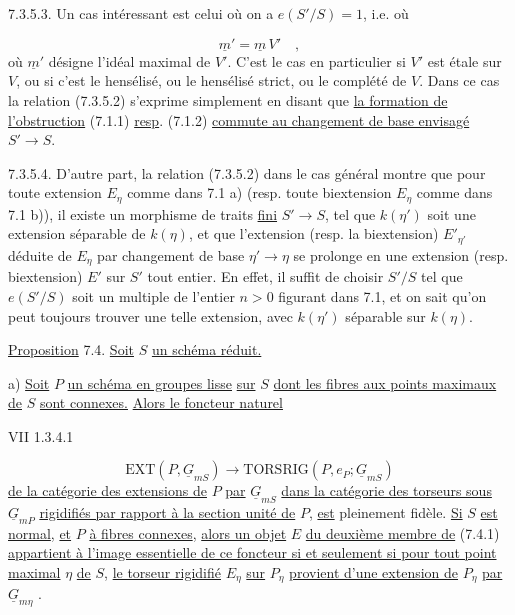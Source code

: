 7.3.5.3. Un cas intéressant est celui où on a $e(S'/S) = 1$, i.e. où

\begin{equation*}
\underline{m}' = \underline{m}\, V' \quad ,
\end{equation*}
où $\underline{m}'$ désigne l'idéal maximal de $V'$. C'est le cas en particulier si $V'$ est étale sur $V$, ou si c'est le hensélisé, ou le hensélisé strict, ou le complété de $V$. Dans ce cas la relation (7.3.5.2) s'exprime simplement en disant que \underline{la formation de l'obstruction} (7.1.1) \underline{resp}. (7.1.2) \underline{commute au changement de base envisagé} $S' \longrightarrow S$.

7.3.5.4. D'autre part, la relation (7.3.5.2) dans le cas général montre que pour toute extension $E_\eta$ comme dans 7.1 a) (resp. toute biextension $E_\eta$ comme dans 7.1 b)), il existe un morphisme de traits \underline{fini} $S' \longrightarrow S$,
tel que $k(\eta')$ soit une extension séparable de $k(\eta)$, et que l'extension (resp. la biextension) $E'_{\eta'}$ déduite de $E_{\eta}$ par changement de base $\eta' \longrightarrow \eta$ se prolonge en une extension (resp. biextension) $E'$ sur $S'$ tout entier. En effet, il suffit de choisir $S'/S$ tel que $e(S'/S)$ soit un multiple de l'entier $n > 0$ figurant dans 7.1, et on sait qu'on peut toujours trouver une telle extension, avec $k(\eta')$ séparable sur $k(\eta)$.


\underline{Proposition} 7.4. \underline{Soit} $S$ \underline{un schéma réduit.}

a) \underline{Soit} $P$ \underline{un schéma en groupes lisse} \underline{sur} $S$ \underline{dont les fibres aux points maximaux de} $S$ \underline{sont connexes.} \underline{Alors le foncteur naturel}

VII 1.3.4.1

\begin{equation}\tag{7.4.1}
\mathrm{EXT}(P,\underline{G}_{mS}) \longrightarrow \mathrm{TORSRIG}(P,e_P;\underline{G}_{mS})
\end{equation}
\underline{de la catégorie des extensions de} $P$ \underline{par} $\underline{G}_{mS}$ \underline{dans la catégorie des torseurs sous} $\underline{G}_{mP}$ \underline{rigidifiés par rapport à la section unité de} $P$, \underline{est} pleinement fidèle. \underline{Si} $S$ \underline{est normal}, \underline{et} $P$ \underline{à fibres connexes}, \underline{alors un objet} $E$ \underline{du deuxième membre de} (7.4.1) \underline{appartient à l'image essentielle de ce foncteur si et seulement si pour tout point maximal} $\eta$ \underline{de} $S$, \underline{le torseur rigidifié} $E_{\eta}$ \underline{sur} $P_{\eta}$ \underline{provient d'une extension de} $P_{\eta}$ \underline{par} $\underline{G}_{m\eta}$ .

